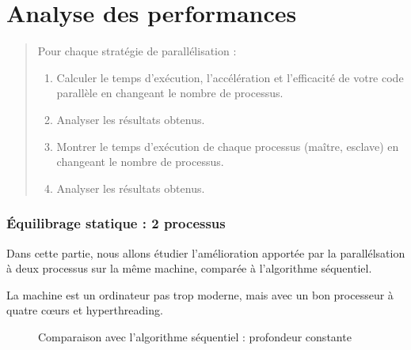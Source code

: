 \section{Analyse des performances}

\question
\label{mandel:q:4}

\begin{quotation}
  Pour chaque stratégie de parallélisation :

  \begin{enumerate}
  \item Calculer le temps d'exécution, l'accélération et l'efficacité
    de votre code parallèle en changeant le nombre de processus.
  \item Analyser les résultats obtenus.
  \item Montrer le temps d'exécution de chaque processus (maître,
    esclave) en changeant le nombre de processus.
  \item Analyser les résultats obtenus.
  \end{enumerate}
\end{quotation}

\subsubsection{Équilibrage statique : 2 processus}

Dans cette partie, nous allons étudier l'amélioration apportée par la
parallélsation à deux processus sur la même machine, comparée à
l'algorithme séquentiel.

La machine est un ordinateur pas trop moderne, mais avec un bon
processeur à quatre cœurs et hyperthreading.

\begin{figure}
  \centering


  \caption{Comparaison avec l'algorithme séquentiel : profondeur
    constante}
  \label{fig:mandel:stat:comp-seq-taille}
\end{figure}

